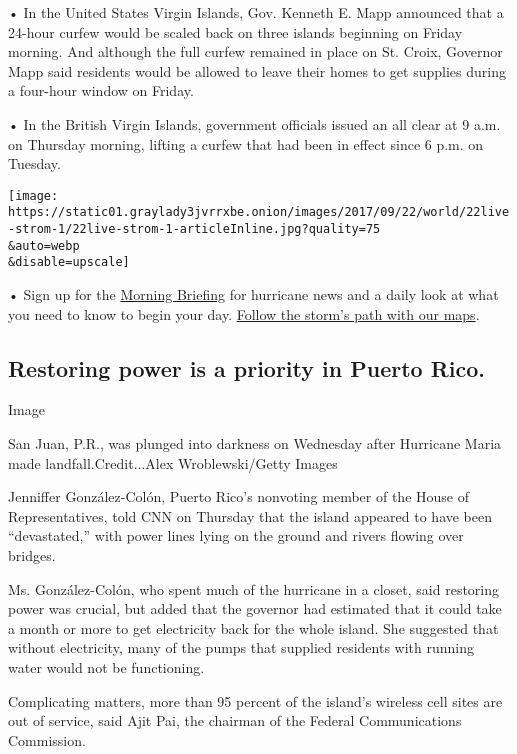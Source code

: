 • In the United States Virgin Islands, Gov. Kenneth E. Mapp announced
that a 24-hour curfew would be scaled back on three islands beginning on
Friday morning. And although the full curfew remained in place on St.
Croix, Governor Mapp said residents would be allowed to leave their
homes to get supplies during a four-hour window on Friday.

• In the British Virgin Islands, government officials issued an all
clear at 9 a.m. on Thursday morning, lifting a curfew that had been in
effect since 6 p.m. on Tuesday.

\texttt{[image: https://static01.graylady3jvrrxbe.onion/images/2017/09/22/world/22live-strom-1/22live-strom-1-articleInline.jpg?quality=75\\\&auto=webp\\\&disable=upscale]}

• Sign up for the
\href{https://www.nytimes3xbfgragh.onion/newsletters/morning-briefing?mcubz=1}{Morning
Briefing} for hurricane news and a daily look at what you need to know
to begin your day.
\href{https://www.nytimes3xbfgragh.onion/interactive/2017/09/18/world/americas/hurricane-maria-tracking-map.html}{Follow
the storm's path with our maps}.

\hypertarget{restoring-power-is-a-priority-in-puerto-rico}{%
\subsection{Restoring power is a priority in Puerto
Rico.}\label{restoring-power-is-a-priority-in-puerto-rico}}

Image

San Juan, P.R., was plunged into darkness on Wednesday after Hurricane
Maria made landfall.Credit...Alex Wroblewski/Getty Images

Jenniffer González-Colón, Puerto Rico's nonvoting member of the House of
Representatives, told CNN on Thursday that the island appeared to have
been ``devastated,'' with power lines lying on the ground and rivers
flowing over bridges.

Ms. González-Colón, who spent much of the hurricane in a closet, said
restoring power was crucial, but added that the governor had estimated
that it could take a month or more to get electricity back for the whole
island. She suggested that without electricity, many of the pumps that
supplied residents with running water would not be functioning.

Complicating matters, more than 95 percent of the island's wireless cell
sites are out of service, said Ajit Pai, the chairman of the Federal
Communications Commission.

